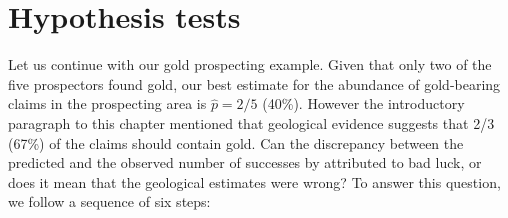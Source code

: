 \section{Hypothesis tests}
\label{sec:binomH}

Let us continue with our gold prospecting example. Given that only two
of the five prospectors found gold, our best estimate for the
abundance of gold-bearing claims in the prospecting area is $\hat{p} =
2/5$ (40\%). However the introductory paragraph to this chapter
mentioned that geological evidence suggests that 2/3 (67\%) of the
claims should contain gold. Can the discrepancy between the predicted
and the observed number of successes by attributed to bad luck, or
does it mean that the geological estimates were wrong? To answer this
question, we follow a sequence of six steps:

